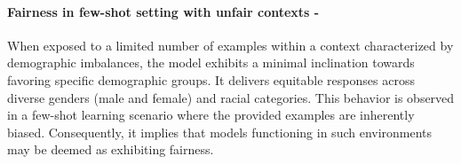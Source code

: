 \paragraph{Fairness in few-shot setting with unfair contexts - \low}
When exposed to a limited number of examples within a context characterized by demographic imbalances, the model exhibits a minimal inclination towards favoring specific demographic groups. It delivers equitable responses across diverse genders (male and female) and racial categories. This behavior is observed in a few-shot learning scenario where the provided examples are inherently biased. Consequently, it implies that models functioning in such environments may be deemed as exhibiting fairness.